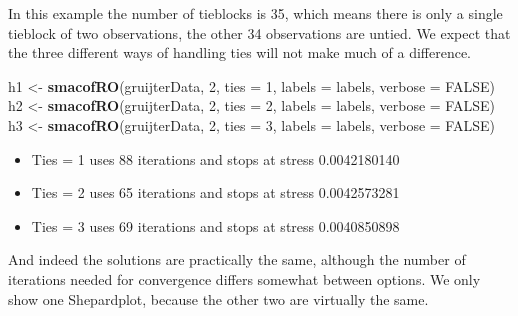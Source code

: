 \documentclass[
  12pt,
]{article}
\newenvironment{Shaded}{\begin{snugshade}}{\end{snugshade}}
\newcommand{\AttributeTok}[1]{\textcolor[rgb]{0.13,0.29,0.53}{#1}}
\newcommand{\ConstantTok}[1]{\textcolor[rgb]{0.56,0.35,0.01}{#1}}
\newcommand{\DecValTok}[1]{\textcolor[rgb]{0.00,0.00,0.81}{#1}}
\newcommand{\FunctionTok}[1]{\textcolor[rgb]{0.13,0.29,0.53}{\textbf{#1}}}
\newcommand{\NormalTok}[1]{#1}
\newcommand{\OtherTok}[1]{\textcolor[rgb]{0.56,0.35,0.01}{#1}}
\providecommand{\tightlist}{%
  \setlength{\itemsep}{0pt}\setlength{\parskip}{0pt}}
\begin{document}
In this example the number of tieblocks is 35, which means
there is only a single tieblock of two observations, the other 34 observations are
untied. We expect that the three different ways of handling ties will not make
much of a difference.

\begin{Shaded}
\begin{Highlighting}[]
\NormalTok{h1 }\OtherTok{\textless{}{-}} \FunctionTok{smacofRO}\NormalTok{(gruijterData, }\DecValTok{2}\NormalTok{, }\AttributeTok{ties =} \DecValTok{1}\NormalTok{, }\AttributeTok{labels =}\NormalTok{ labels, }\AttributeTok{verbose =} \ConstantTok{FALSE}\NormalTok{)}
\NormalTok{h2 }\OtherTok{\textless{}{-}} \FunctionTok{smacofRO}\NormalTok{(gruijterData, }\DecValTok{2}\NormalTok{, }\AttributeTok{ties =} \DecValTok{2}\NormalTok{, }\AttributeTok{labels =}\NormalTok{ labels, }\AttributeTok{verbose =} \ConstantTok{FALSE}\NormalTok{)}
\NormalTok{h3 }\OtherTok{\textless{}{-}} \FunctionTok{smacofRO}\NormalTok{(gruijterData, }\DecValTok{2}\NormalTok{, }\AttributeTok{ties =} \DecValTok{3}\NormalTok{, }\AttributeTok{labels =}\NormalTok{ labels, }\AttributeTok{verbose =} \ConstantTok{FALSE}\NormalTok{)}
\end{Highlighting}
\end{Shaded}

\begin{itemize}
\tightlist
\item
  Ties = 1 uses 88 iterations and stops at stress 0.0042180140
\item
  Ties = 2 uses 65 iterations and stops at stress 0.0042573281
\item
  Ties = 3 uses 69 iterations and stops at stress 0.0040850898
\end{itemize}

And indeed the solutions are practically the same, although the number of iterations needed for convergence
differs somewhat between options. We only show one Shepardplot, because the other two are virtually the same.
\end{document}
